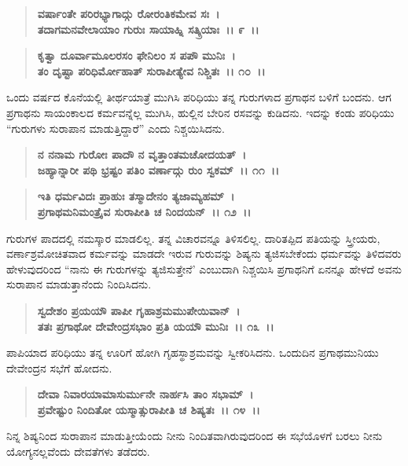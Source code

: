 \begin{verse}
\textbf{ವರ್ಷಾಂತೇ ಪರಿರಭ್ಯಾಗಾದ್ಗು ರೋರಂತಿಕಮೇವ ಸಃ~।}\\\textbf{ತದಾಗಮನವೇಲಾಯಾಂ ಗುರುಃ ಸಾಯಾಹ್ನಿ ಸತ್ಕ್ರಿಯಾಃ~।। ೯~।। }
\end{verse}

\begin{verse}
\textbf{ಕೃತ್ವಾ ದೂರ್ವಾಮೂಲರಸಂ ಫೇನಿಲಂ ಸ ಪಪೌ ಮುನಿಃ~।}\\\textbf{ತಂ ದೃಷ್ಟಾ ಪರಿಧಿರ್ಮೋಹಾತ್ ಸುರಾಪೀತ್ಯೇವ ನಿಶ್ಚಿತಃ~।। ೧೦~।।}
\end{verse}

ಒಂದು ವರ್ಷದ ಕೊನೆಯಲ್ಲಿ ತೀರ್ಥಯಾತ್ರೆ ಮುಗಿಸಿ ಪರಿಧಿಯು ತನ್ನ ಗುರುಗಳಾದ ಪ್ರಗಾಥನ ಬಳಿಗೆ ಬಂದನು. ಆಗ ಪ್ರಗಾಥನು ಸಾಯಂಕಾಲದ ಕರ್ಮವನ್ನೆಲ್ಲ ಮುಗಿಸಿ, ಹುಲ್ಲಿನ ಬೇರಿನ ರಸವನ್ನು ಕುಡಿದನು. ಇದನ್ನು ಕಂಡು ಪರಿಧಿಯು “ಗುರುಗಳು ಸುರಾಪಾನ ಮಾಡುತ್ತಿದ್ದಾರೆ” ಎಂದು ನಿಶ್ಚಯಿಸಿದನು.

\begin{verse}
\textbf{ನ ನನಾಮ ಗುರೋಃ ಪಾದೌ ನ ವೃತ್ತಾಂತಮಚೋದಯತ್~।}\\\textbf{ಜಹ್ಯಾನ್ನಾರೀ ಪಥಿ ಭ್ರಷ್ಟಂ ಪತಿಂ ವರ್ಣಾದ್ಗು ರುಂ ಸ್ವಕಮ್~।। ೧೧~।। }
\end{verse}

\begin{verse}
\textbf{ಇತಿ ಧರ್ಮವಿದಃ ಪ್ರಾಹುಃ ತಸ್ಮಾದೇನಂ ತ್ಯಜಾಮ್ಯಹಮ್~।}\\\textbf{ಪ್ರಗಾಥಮನಿಮಂತ್ರೈವ ಸುರಾಪೀತಿ ಚ ನಿಂದಯನ್~।। ೧೨~।।}
\end{verse}

ಗುರುಗಳ ಪಾದದಲ್ಲಿ ನಮಸ್ಕಾರ ಮಾಡಲಿಲ್ಲ. ತನ್ನ ವಿಚಾರವನ್ನೂ ತಿಳಿಸಲಿಲ್ಲ. ದಾರಿತಪ್ಪಿದ ಪತಿಯನ್ನು ಸ್ತ್ರೀಯರು, ವರ್ಣಾಶ್ರಮೋಚಿತವಾದ ಕರ್ಮವನ್ನು ಮಾಡದೇ ಇರುವ ಗುರುವನ್ನು ಶಿಷ್ಯನು ತ್ಯಜಿಸಬೇಕೆಂದು ಧರ್ಮವನ್ನು ತಿಳಿದವರು ಹೇಳುವುದರಿಂದ “ನಾನು ಈ ಗುರುಗಳನ್ನು ತ್ಯಜಿಸುತ್ತೇನೆ' ಎಂಬುದಾಗಿ ನಿಶ್ಚಯಿಸಿ ಪ್ರಗಾಥನಿಗೆ ಏನನ್ನೂ ಹೇಳದೆ ಅವನು ಸುರಾಪಾನ ಮಾಡುತ್ತಾನೆಂದು ನಿಂದಿಸಿದನು.

\begin{verse}
\textbf{ಸ್ವದೇಶಂ ಪ್ರಯಯೌ ಪಾಪೀ ಗೃಹಾಶ್ರಮಮುಪೇಯಿವಾನ್~।}\\\textbf{ತತಃ ಪ್ರಗಾಥೋ ದೇವೇಂದ್ರಸಭಾಂ ಪ್ರತಿ ಯಯೌ ಮುನಿಃ~।। ೧೩~।।}
\end{verse}

ಪಾಪಿಯಾದ ಪರಿಧಿಯು ತನ್ನ ಊರಿಗೆ ಹೋಗಿ ಗೃಹಸ್ಥಾಶ್ರಮವನ್ನು ಸ್ವೀಕರಿಸಿದನು. ಒಂದುದಿನ ಪ್ರಗಾಥಮುನಿಯು ದೇವೇಂದ್ರನ ಸಭೆಗೆ ಹೋದನು.

\begin{verse}
\textbf{ದೇವಾ ನಿವಾರಯಾಮಾಸುರ್ಮುನೇ ನಾರ್ಹಸಿ ತಾಂ ಸಭಾಮ್~।}\\\textbf{ಪ್ರವೇಷ್ಟುಂ ನಿಂದಿತೋ ಯಸ್ಮಾತ್ಸುರಾಪೀತಿ ಚ ಶಿಷ್ಯತಃ~।। ೧೪~।।}
\end{verse}

ನಿನ್ನ ಶಿಷ್ಯನಿಂದ ಸುರಾಪಾನ ಮಾಡುತ್ತೀಯೆಂದು ನೀನು ನಿಂದಿತವಾಗಿರುವುದರಿಂದ ಈ ಸಭೆಯೊಳಗೆ ಬರಲು ನೀನು ಯೋಗ್ಯನಲ್ಲವೆಂದು ದೇವತೆಗಳು ತಡೆದರು.

